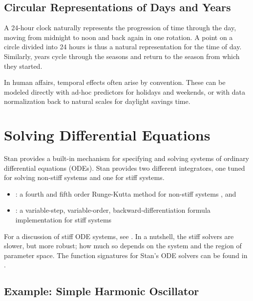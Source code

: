 \section{Circular Representations of Days and Years}

A 24-hour clock naturally represents the progression of time through
the day, moving from midnight to noon and back again in one rotation.
A point on a circle divided into 24 hours is thus a natural
representation for the time of day.  Similarly, years cycle through
the seasons and return to the season from which they started.

In human affairs, temporal effects often arise by convention.  These
can be modeled directly with ad-hoc predictors for holidays and
weekends, or with data normalization back to natural scales for
daylight savings time.



\chapter{Solving Differential Equations}\label{ode-solver.chapter}

\noindent
Stan provides a built-in mechanism for specifying and solving systems
of ordinary differential equations (ODEs).  Stan provides two
different integrators, one tuned for solving non-stiff systems and one
for stiff systems.
%
\begin{itemize}
\item {}: a fourth and fifth order Runge-Kutta method for
  non-stiff systems \citep{DormandPrince:1980,AhnertMulansky:2011}, and
\item {}: a variable-step, variable-order,
  backward-differentiation formula implementation for stiff systems
  \citep{CohenHindmarsh:1996,SerbanHindmarsh:2005}
\end{itemize}
%
For a discussion of stiff ODE systems, see .  In
a nutshell, the stiff solvers are slower, but more robust;  how much
so depends on the system and the region of parameter space.
The function signatures for Stan's ODE solvers can be found in
.


\section{Example: Simple Harmonic Oscillator}

